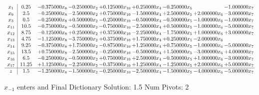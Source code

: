 \documentclass[10pt]{article}
\begin{document}
 \[\begin{array}{c| c c@{\hskip 2pt} c@{\hskip 2pt} c@{\hskip 2pt} c@{\hskip 2pt} c@{\hskip 2pt} c@{\hskip 2pt} c@{\hskip 2pt} }
 x_{1}   &  0.25 & -0.375000 x_{8} & -0.250000 x_{2} & + 0.125000 x_{10} & + 0.250000 x_{4} & -0.250000 x_{5} &   & -1.000000 x_{7}\\
 x_{9}   &  2.5 & -0.250000 x_{8} & -2.500000 x_{2} & + 0.750000 x_{10} & -1.500000 x_{4} & + 2.500000 x_{5} & + 2.000000 x_{6} & -3.000000 x_{7}\\
 x_{3}   &  0.5 & -0.250000 x_{8} & + 0.500000 x_{2} & -0.250000 x_{10} & -0.500000 x_{4} & -0.500000 x_{5} & -1.000000 x_{6} & -1.000000 x_{7}\\
 x_{11}   &  10.5 & -0.750000 x_{8} & -0.500000 x_{2} & -0.750000 x_{10} & -2.500000 x_{4} & + 0.500000 x_{5} & -1.000000 x_{6} & -5.000000 x_{7}\\
 x_{12}   &  8.75 & -0.125000 x_{8} & + 0.250000 x_{2} & + 0.375000 x_{10} & -2.250000 x_{4} & -1.750000 x_{5} & + 1.000000 x_{6} & + 3.000000 x_{7}\\
 x_{13}   &  4.75 & -1.125000 x_{8} & -3.750000 x_{2} & + 0.375000 x_{10} & + 1.750000 x_{4} & + 0.250000 x_{5} & -2.000000 x_{6} &   \\
 x_{14}   &  9.25 & -0.375000 x_{8} & + 1.750000 x_{2} & -0.875000 x_{10} & + 1.250000 x_{4} & + 0.750000 x_{5} & -1.000000 x_{6} & -5.000000 x_{7}\\
 x_{15}   &  13.5 & + 0.750000 x_{8} & -2.500000 x_{2} & -0.250000 x_{10} & -0.500000 x_{4} & + 1.500000 x_{5} & -3.000000 x_{6} & + 4.000000 x_{7}\\
 x_{16}   &  6.5 & -0.250000 x_{8} & -0.500000 x_{2} & + 0.750000 x_{10} & + 2.500000 x_{4} & -0.500000 x_{5} & + 1.000000 x_{6} & -3.000000 x_{7}\\
 x_{17}   &  11.25 & + 1.125000 x_{8} & -2.250000 x_{2} & -0.375000 x_{10} & + 1.250000 x_{4} & -1.250000 x_{5} & + 2.000000 x_{6} & + 5.000000 x_{7}\\
\hline
z    &  1.5 & -1.250000 x_{8} & -1.500000 x_{2} & -0.250000 x_{10} & -2.500000 x_{4} & -1.500000 x_{5} & -4.000000 x_{6} & -5.000000 x_{7}\\
\end{array}\]


 $ x_{-1} $ enters and Final Dictionary
Solution:  1.5
Num Pivots:  2
\end{document}
